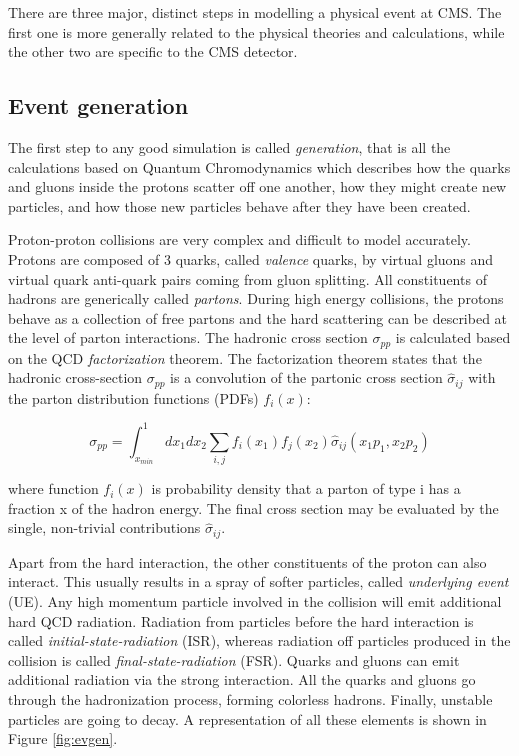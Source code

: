 There are three major, distinct steps in modelling a physical event at CMS. The first one is more generally related to the physical theories and calculations, while the other two are specific to the CMS detector.

\subsection{Event generation}

The first step to any good simulation is called \emph{generation}, that is all the calculations based on Quantum Chromodynamics which describes how the quarks and gluons inside the protons scatter off one another, how they might create new particles, and how those new particles behave after they have been created. 

Proton-proton collisions are very complex and difficult to model accurately. Protons are
composed of 3 quarks, called \emph{valence} quarks, by virtual gluons and virtual quark anti-quark
pairs coming from gluon splitting. All constituents of hadrons are generically called \emph{partons}.
During high energy collisions, the protons behave as a collection of free partons and the
hard scattering can be described at the level of parton interactions. The hadronic cross
section $\sigma_{pp}$ is calculated based on the QCD \emph{factorization} theorem. The factorization theorem
states that the hadronic cross-section $\sigma_{pp}$ is a convolution of the partonic cross section  $\hat{\sigma}_{ij}$ with the parton distribution functions (PDFs) $f_i(x)$:

\[
\sigma_{pp} = \int_{x_{min}}^1 dx_1 dx_2 \sum_{i,j}f_i(x_1)f_j(x_2)\hat{\sigma}_{ij}(x_1 p_1, x_2 p_2)
\]

where function $f_i(x)$ is probability density that a parton of type i has a fraction x of the
hadron energy. The final cross section may be evaluated by the single, non-trivial contributions $\hat{\sigma}_{ij}$.

Apart from the hard interaction, the other constituents of the proton can also interact. This
usually results in a spray of softer particles, called \emph{underlying event} (UE). Any high momentum particle involved in the collision will emit additional hard QCD radiation. Radiation
from particles before the hard interaction is called \emph{initial-state-radiation} (ISR), whereas radiation off particles produced in the collision is called \emph{final-state-radiation} (FSR). Quarks and gluons can emit additional radiation via the strong interaction. All the quarks
and gluons go through the hadronization process, forming colorless hadrons. Finally, unstable particles are going to decay. A representation of all these elements is shown in Figure \ref{fig:evgen}.          

